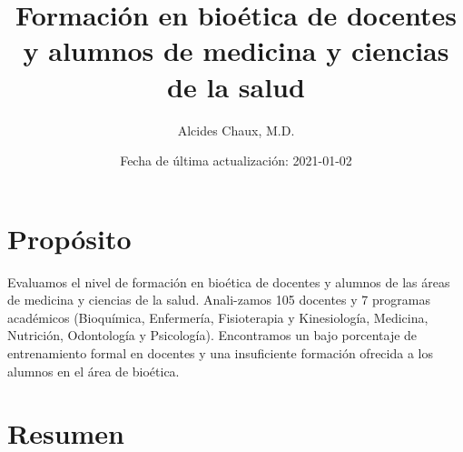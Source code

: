 \documentclass[
]{book}
\title{Formación en bioética de docentes y alumnos de medicina y ciencias de la salud}
\author{Alcides Chaux, M.D.}
\date{Fecha de última actualización: 2021-01-02}
\begin{document}
\maketitle

{
\setcounter{tocdepth}{1}
\tableofcontents
}
\hypertarget{propuxf3sito}{%
\chapter{Propósito}\label{propuxf3sito}}

Evaluamos el nivel de formación en bioética de docentes y alumnos de las áreas de medicina y ciencias de la salud. Anali-zamos 105 docentes y 7 programas académicos (Bioquímica, Enfermería, Fisioterapia y Kinesiología, Medicina, Nutrición, Odontología y Psicología). Encontramos un bajo porcentaje de entrenamiento formal en docentes y una insuficiente formación ofrecida a los alumnos en el área de bioética.

\hypertarget{resumen}{%
\chapter{Resumen}\label{resumen}}
\end{document}
